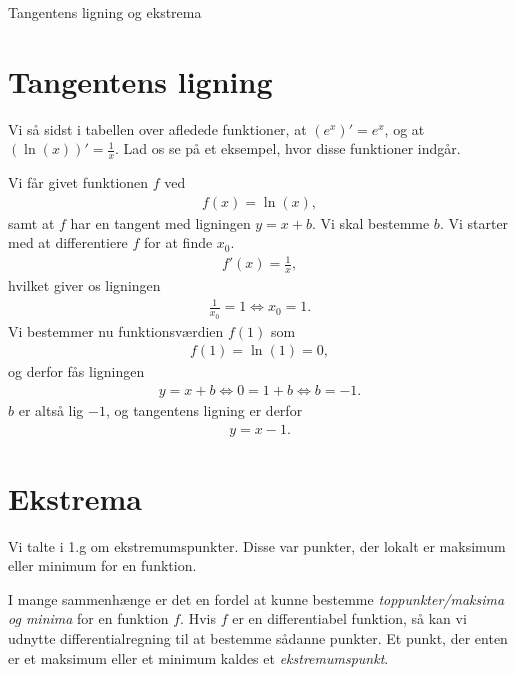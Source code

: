 \begin{center}
	\Huge
	Tangentens ligning og ekstrema
\end{center}

\section*{Tangentens ligning}

Vi så sidst i tabellen over afledede funktioner, at $(e^x)' = e^x$, og at $(\ln(x))' = \frac{1}{x}$. Lad os se på et eksempel, hvor disse funktioner indgår.

\begin{exa}
	Vi får givet funktionen $f$ ved
	\begin{align*}
		f(x) = \ln(x),
	\end{align*}
	samt at $f$ har en tangent med ligningen $y = x + b$. Vi skal bestemme $b$.
	Vi starter med at differentiere $f$ for at finde $x_0$.
	\begin{align*}
		f'(x) = \frac{1}{x},
	\end{align*}
	hvilket giver os ligningen 
	\begin{align*}
		\frac{1}{x_0} = 1 \Leftrightarrow x_0 = 1.
	\end{align*}
	Vi bestemmer nu funktionsværdien $f(1)$ som
	\begin{align*}
		f(1) = \ln(1) = 0,
	\end{align*}
	og derfor fås ligningen 
	\begin{align*}
		y = x + b \Leftrightarrow 0 = 1 + b \Leftrightarrow b = -1.
	\end{align*}
	$b$ er altså lig $-1$, og tangentens ligning er derfor
	\begin{align*}
		y = x - 1.
	\end{align*}
\end{exa}

\section*{Ekstrema}

Vi talte i 1.g om ekstremumspunkter. Disse var punkter, der lokalt er maksimum eller minimum for en funktion. 

I mange sammenhænge er det en fordel at kunne bestemme \textit{toppunkter/maksima og minima} for en funktion $f$. Hvis $f$ er en differentiabel funktion, så kan vi udnytte differentialregning til at bestemme sådanne punkter. Et punkt, der enten er et maksimum eller et minimum kaldes et \textit{ekstremumspunkt}. 

